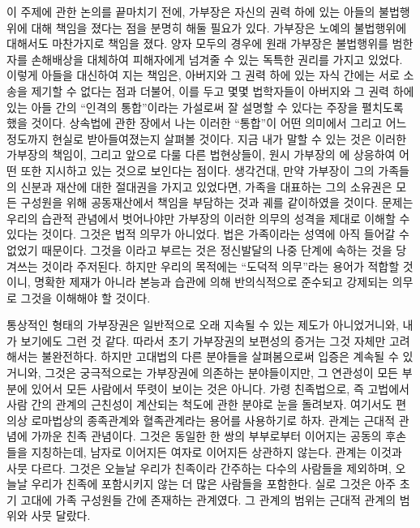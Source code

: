 이 주제에 관한 논의를 끝마치기 전에,
가부장은 자신의 권력 하에 있는 아들의 불법행위에 대해
책임을 졌다는 점을 분명히 해둘 필요가 있다.
가부장은 노예의 불법행위에 대해서도 마찬가지로 책임을 졌다.
양자 모두의 경우에
원래
가부장은
불법행위를 범한 자를
손해배상을 대체하여
피해자에게 넘겨줄 수 있는 독특한 권리를 가지고 있었다.
이렇게 아들을 대신하여 지는 책임은,
아버지와 그 권력 하에 있는 자식 간에는
서로 소송을 제기할 수 없다는 점과 더불어,
이를 두고 몇몇 법학자들이
아버지와 그 권력 하에 있는 아들 간의
``인격의 통합''이라는 가설로써 잘 설명할 수 있다는
주장을 펼치도록 했을 것이다.
상속법에 관한 장에서 나는 이러한 ``통합''이 어떤 의미에서
그리고 어느 정도까지 현실로 받아들여졌는지 살펴볼 것이다.
지금 내가 말할 수 있는 것은
이러한 가부장의 책임이, 그리고 앞으로 다룰 다른 법현상들이,
원시 가부장의 에 상응하여 어떤  또한
지시하고 있는 것으로 보인다는 점이다.
생각건대,
만약 가부장이 그의 가족들의 신분과 재산에 대한 절대권을 가지고 있었다면,
가족을 대표하는 그의 소유권은 모든 구성원을 위해 공동재산에서 책임을
부담하는 것과 궤를 같이하였을 것이다.
문제는 우리의 습관적 관념에서 벗어나야만 가부장의 이러한 의무의 성격을
제대로 이해할 수 있다는 것이다.
그것은 법적 의무가 아니었다. 법은 가족이라는 성역에 아직
들어갈 수 없었기 때문이다.
그것을 이라고 부르는 것은 정신발달의 나중 단계에 속하는 것을
당겨쓰는 것이라 주저된다.
하지만 우리의 목적에는 ``도덕적 의무''라는 용어가 적합할 것이니,
명확한 제재가 아니라 본능과 습관에 의해 반의식적으로
준수되고 강제되는 의무로 그것을 이해해야 할 것이다.

통상적인 형태의 가부장권은 일반적으로 오래 지속될 수 있는 제도가 아니었거니와,
내가 보기에도 그런 것 같다.
따라서 초기 가부장권의 보편성의 증거는 그것 자체만 고려해서는 불완전하다.
하지만 고대법의 다른 분야들을 살펴봄으로써 입증은 계속될 수 있거니와,
그것은 궁극적으로는 가부장권에 의존하는 분야들이지만,
그 연관성이 모든 부분에 있어서 모든 사람에서 뚜렷이 보이는 것은 아니다.
가령 친족법으로,
즉 고법에서 사람 간의 관계의 근친성이 계산되는 척도에 관한 분야로
눈을 돌려보자.
여기서도 편의상 로마법상의 종족관계와
혈족관계라는 용어를 사용하기로 하자.
관계는 근대적 관념에 가까운 친족 관념이다.
그것은 동일한 한 쌍의 부부로부터 이어지는 공동의 후손들을 지칭하는데,
남자로 이어지든 여자로 이어지든 상관하지 않는다.
관계는 이것과 사뭇 다르다.
그것은 오늘날 우리가 친족이라 간주하는 다수의 사람들을 제외하며,
오늘날 우리가 친족에 포함시키지 않는 더 많은 사람들을 포함한다.
실로 그것은 아주 초기 고대에 가족 구성원들 간에 존재하는 관계였다.
그 관계의 범위는 근대적 관계의 범위와 사뭇 달랐다.


